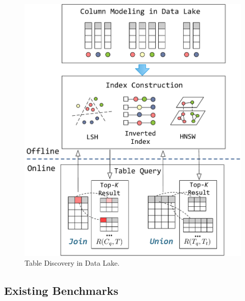 \begin{figure}[h]
	\centering
	\includegraphics[width=0.95\linewidth]{fig/framework.pdf}
	\caption{Table Discovery in Data Lake.}
	\label{fig:framework}
\end{figure}





\iffalse
\subsection{Existing Benchmarks}

